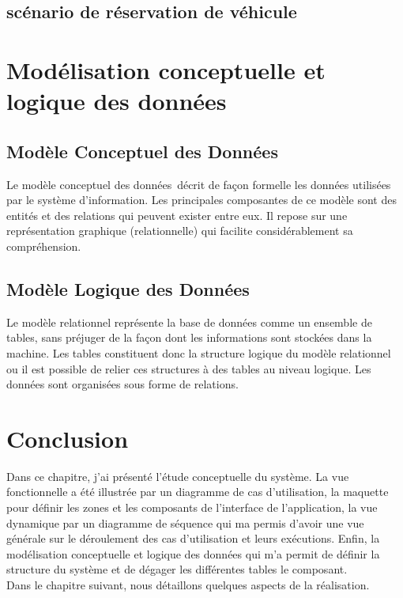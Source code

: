 \documentclass[12pt,a4paper]{report}
\begin{document}
			\subsection{scénario de réservation de véhicule}
		
			
			
		

		\section{Modélisation conceptuelle et logique des données}
			\subsection{Modèle Conceptuel des Données}
Le modèle conceptuel des données décrit de façon formelle les données utilisées par le système d’information. Les principales composantes de ce modèle sont des entités et des relations qui peuvent exister entre eux. Il repose sur une représentation graphique (relationnelle) qui facilite considérablement sa compréhension.
			

			\subsection{Modèle Logique des Données}
Le modèle relationnel représente la base de données comme un ensemble de tables, sans préjuger de la façon dont les informations sont stockées dans la machine. Les tables constituent donc la structure logique du modèle relationnel ou il est possible de relier ces structures à des tables au niveau logique. Les données sont organisées sous forme de relations.


		
		\section{Conclusion}
Dans ce chapitre, j'ai présenté l'étude conceptuelle du système. La vue fonctionnelle a été illustrée par un diagramme de cas d’utilisation, la maquette pour définir les zones et les composants de l’interface de l'application, la vue dynamique par un diagramme de séquence qui ma permis d'avoir une vue générale sur le déroulement des cas d'utilisation et leurs exécutions. Enfin, la modélisation conceptuelle et logique des données qui m'a permit de définir la structure du système et de dégager les différentes tables le composant.\\
Dans le chapitre suivant, nous détaillons quelques aspects de la réalisation.	
	
\end{document}

